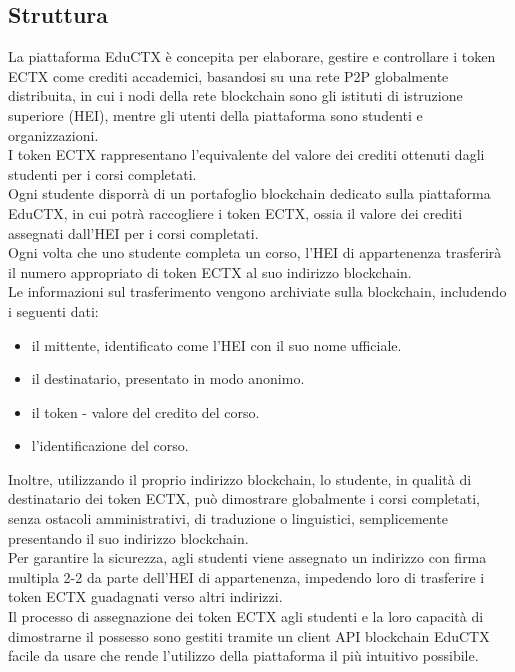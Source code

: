 \subsection{Struttura}
La piattaforma EduCTX è concepita per elaborare, gestire e controllare i token ECTX come crediti accademici, basandosi su una rete P2P globalmente distribuita, 
in cui i nodi della rete blockchain sono gli istituti di istruzione superiore (HEI), mentre gli utenti della piattaforma sono studenti e organizzazioni.
\\I token ECTX rappresentano l’equivalente del valore dei crediti ottenuti dagli studenti per i corsi completati.
\\Ogni studente disporrà di un portafoglio blockchain dedicato sulla piattaforma EduCTX, in cui potrà raccogliere i token ECTX, ossia il valore dei crediti assegnati dall’HEI per i corsi completati. 
\\Ogni volta che uno studente completa un corso, l’HEI di appartenenza trasferirà il numero appropriato di token ECTX al suo indirizzo blockchain. 
\\Le informazioni sul trasferimento vengono archiviate sulla blockchain, 
includendo i seguenti dati: 
\begin{itemize}
    \item il mittente, identificato come l’HEI con il suo nome ufficiale.
    \item il destinatario, presentato in modo anonimo.
    \item il token - valore del credito del corso.
    \item l’identificazione del corso.
\end{itemize}
Inoltre, utilizzando il proprio indirizzo blockchain, lo studente, in qualità di destinatario dei token ECTX, può dimostrare globalmente i corsi completati, senza ostacoli amministrativi, di traduzione o linguistici, semplicemente presentando il suo indirizzo blockchain. 
\\Per garantire la sicurezza, agli studenti viene assegnato un indirizzo con firma multipla 2-2 da parte dell’HEI di appartenenza, impedendo loro di trasferire i token ECTX guadagnati verso altri indirizzi. 
\\Il processo di assegnazione dei token ECTX agli studenti e la loro capacità di dimostrarne il possesso sono gestiti tramite un client API blockchain EduCTX facile da usare che rende l’utilizzo della piattaforma il più intuitivo possibile.
